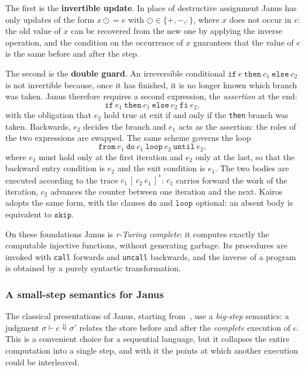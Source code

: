 The first is the \textbf{invertible update}. In place of destructive
assignment Janus has only updates of the form $x \mathrel{\odot}= e$ with
$\odot \in \{+,-,\hat{\ }\}$, where $x$ does not occur in $e$: the old value of
$x$ can be recovered from the new one by applying the inverse operation, and the condition
on the occurrence of $x$ guarantees that the value of $e$ is the same before and
after the step.

The second is the \textbf{double guard}. An irreversible conditional
$\mathtt{if}\ e\ \mathtt{then}\ c_1\ \mathtt{else}\ c_2$ is not invertible
because, once it has finished, it is no longer known which branch was taken. Janus
therefore requires a second expression, the \emph{assertion} at the end:
\[
\mathtt{if}\ e_1\ \mathtt{then}\ c_1\ \mathtt{else}\ c_2\ \mathtt{fi}\ e_2 ,
\]
with the obligation that $e_2$ hold true at exit if and only if the
\texttt{then} branch was taken. Backwards, $e_2$ decides the branch and $e_1$ acts as the
assertion: the roles of the two expressions are swapped. The same scheme governs
the loop
\[
\mathtt{from}\ e_1\ \mathtt{do}\ c_1\ \mathtt{loop}\ c_2\ \mathtt{until}\ e_2 ,
\]
where $e_1$ must hold only at the first iteration and $e_2$ only at the last, so
that the backward entry condition is $e_2$ and the exit condition is $e_1$.
The two bodies are executed according to the trace $c_1\,[\,c_2\ c_1\,]^{*}$: $c_1$
carries forward the work of the iteration, $c_2$ advances the counter between
one iteration and the next. Kairos adopts the same form, with the clauses
$\mathtt{do}$ and $\mathtt{loop}$ optional: an absent body is equivalent to
$\mathtt{skip}$.

On these foundations Janus is \emph{r-Turing complete}: it computes exactly the
computable injective functions, without generating garbage. Its procedures are invoked
with \texttt{call} forwards and \texttt{uncall} backwards, and the inverse of a
program is obtained by a purely syntactic transformation.

\subsubsection{A small-step semantics for Janus}

The classical presentations of Janus, starting from~\cite{YokoyamaGluck2007},
use a \emph{big-step} semantics: a judgment $\sigma \vdash c \Downarrow
\sigma'$ relates the store before and after the \emph{complete} execution
of $c$. This is a convenient choice for a sequential language, but it collapses the entire
computation into a single step, and with it the points at which another
execution could be interleaved.


